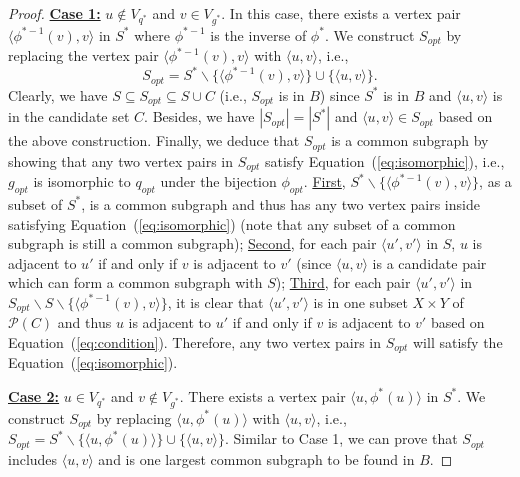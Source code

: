 \begin{proof}
    \smallskip
    \noindent\underline{\textbf{Case 1:}} $u\notin V_{q^*}$ and $v\in V_{g^*}$. In this case, there exists a vertex pair $\langle\phi^{*-1}(v),v \rangle$ in $S^*$ where $\phi^{*-1}$ is the inverse of $\phi^*$. We construct $S_{opt}$ by replacing the vertex pair $\langle\phi^{*-1}(v),v \rangle$ with $\langle u,v \rangle$, i.e.,
    \begin{equation}
        S_{opt}=S^*\backslash\{ \langle\phi^{*-1}(v),v \rangle\} \cup \{\langle u,v \rangle\}.
    \end{equation}
    Clearly, we have $S\subseteq S_{opt}\subseteq S\cup C$ (i.e., $S_{opt}$ is in $B$) since $S^*$ is in $B$ and $\langle u,v\rangle$ is in the candidate set $C$. Besides, we have $|S_{opt}|=|S^*|$ and $\langle u,v \rangle\in S_{opt}$ based on the above construction. Finally, we deduce that $S_{opt}$ is a common subgraph by showing that any two vertex pairs in $S_{opt}$ satisfy Equation~(\ref{eq:isomorphic}), i.e., $g_{opt}$ is isomorphic to $q_{opt}$ under the bijection $\phi_{opt}$. \underline{First}, $S^*\backslash\{\langle \phi^{*-1}(v),v\rangle\}$, as a subset of $S^*$, is a common subgraph and thus has any two vertex pairs inside satisfying Equation~(\ref{eq:isomorphic}) (note that any subset of a common subgraph is still a common subgraph); \underline{Second}, for each pair $\langle u',v' \rangle$ in $S$, $u$ is adjacent to $u'$ if and only if $v$ is adjacent to $v'$ (since $\langle u,v \rangle$ is a candidate pair which can form a common subgraph with $S$); \underline{Third}, for each pair $\langle u',v' \rangle$ in $S_{opt}\backslash S\backslash\{\langle \phi^{*-1}(v),v\rangle\}$, it is clear that $\langle u',v' \rangle$ is in one subset $ X\times Y$ of $\mathcal{P}(C)$ and thus $u$ is adjacent to $u'$ if and only if $v$ is adjacent to $v'$ based on Equation~(\ref{eq:condition}). Therefore, any two vertex pairs in $S_{opt}$ will satisfy the Equation~(\ref{eq:isomorphic}).

    \smallskip
    \noindent\underline{\textbf{Case 2:}} $u\in V_{q^*}$ and $v\notin V_{g^*}$. There exists a vertex pair $\langle u,\phi^*(u) \rangle$ in $S^*$. We construct $S_{opt}$ by replacing $\langle u,\phi^*(u) \rangle$ with $\langle u,v \rangle$, i.e., $S_{opt}=S^*\backslash \{\langle u,\phi^*(u) \rangle\}\cup\{\langle u,v \rangle\}$. Similar to Case 1, we can prove that $S_{opt}$ includes $\langle u,v \rangle$ and is one largest common subgraph to be found in $B$. 


\end{proof}
